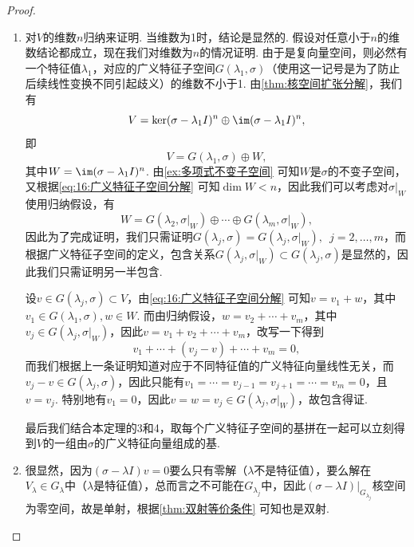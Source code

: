 \begin{proof}
\begin{enumerate}
              这一线性无关的证明思想相信读者并不陌生，只是有一些独特的细节处理. 这种排除其它系数只留下一个系数必须为零的技巧我们已经多次见到.

        \item 对$V$的维数$n$归纳来证明. 当维数为1时，结论是显然的. 假设对任意小于$n$的维数结论都成立，现在我们对维数为$n$的情况证明. 由于是复向量空间，则必然有一个特征值$\lambda_1$，对应的广义特征子空间$G(\lambda_1,\sigma)$（使用这一记号是为了防止后续线性变换不同引起歧义）的维数不小于1. 由\autoref{thm:核空间扩张分解}，我们有
              \[V=\ker(\sigma-\lambda_1 I)^n\oplus\im(\sigma-\lambda_1 I)^n,\]
              即
              \begin{equation} \label{eq:16:广义特征子空间分解}
                  V=G(\lambda_1,\sigma)\oplus W,
              \end{equation}
              其中$W=\im(\sigma-\lambda_1 I)^n$. 由\autoref{ex:多项式不变子空间} 可知$W$是$\sigma$的不变子空间，又根据\autoref{eq:16:广义特征子空间分解} 可知$\dim W<n$，因此我们可以考虑对$\sigma\vert_W$使用归纳假设，有
              \[W=G(\lambda_2,\sigma\vert_W)\oplus\cdots\oplus G(\lambda_m,\sigma\vert_W),\]
              因此为了完成证明，我们只需证明$G(\lambda_j,\sigma)=G(\lambda_j,\sigma\vert_W),\enspace j=2,\ldots,m$，而根据广义特征子空间的定义，包含关系$G(\lambda_j,\sigma\vert_W)\subset G(\lambda_j,\sigma)$是显然的，因此我们只需证明另一半包含.

              设$v\in G(\lambda_j,\sigma)\subset V$，由\autoref{eq:16:广义特征子空间分解} 可知$v=v_1+w$，其中$v_1\in G(\lambda_1,\sigma),w\in W$. 而由归纳假设，$w=v_2+\cdots+v_m$，其中$v_j\in G(\lambda_j,\sigma\vert_W)$，因此$v=v_1+v_2+\cdots+v_m$，改写一下得到
              \[v_1+\cdots+(v_j-v)+\cdots+v_m=0,\]
              而我们根据上一条证明知道对应于不同特征值的广义特征向量线性无关，而$v_j-v\in G(\lambda_j,\sigma)$，因此只能有$v_1=\cdots=v_{j-1}=v_{j+1}=\cdots=v_m=0$，且$v=v_j$. 特别地有$v_1=0$，因此$v=w=v_j\in G(\lambda_j,\sigma\vert_W)$，故包含得证.

              最后我们结合本定理的3和4，取每个广义特征子空间的基拼在一起可以立刻得到$V$的一组由$\sigma$的广义特征向量组成的基.

        \item 很显然，因为$(\sigma-\lambda I)v=0$要么只有零解（$\lambda$不是特征值），要么解在$V_\lambda\in G_\lambda$中（$\lambda$是特征值），总而言之不可能在$G_{\lambda_j}$中，因此$(\sigma-\lambda I)\vert_{G_{\lambda_j}}$核空间为零空间，故是单射，根据\autoref{thm:双射等价条件} 可知也是双射.
    \end{enumerate}
\end{proof}


